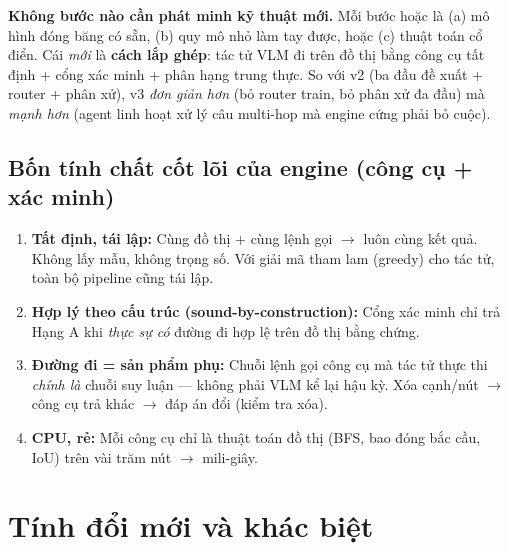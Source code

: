 \documentclass[11pt,a4paper]{article}
\begin{document}
\begin{keyinsight}
\textbf{Không bước nào cần phát minh kỹ thuật mới.} Mỗi bước hoặc là (a) mô hình đóng băng có sẵn, (b) quy mô nhỏ làm tay được, hoặc (c) thuật toán cổ điển. Cái \emph{mới} là \textbf{cách lắp ghép}: tác tử VLM đi trên đồ thị bằng công cụ tất định + cổng xác minh + phân hạng trung thực. So với v2 (ba đầu đề xuất + router + phân xử), v3 \emph{đơn giản hơn} (bỏ router train, bỏ phân xử đa đầu) mà \emph{mạnh hơn} (agent linh hoạt xử lý câu multi-hop mà engine cứng phải bỏ cuộc).
\end{keyinsight}


\subsection{Bốn tính chất cốt lõi của engine (công cụ + xác minh)}

\begin{enumerate}[leftmargin=1.5em]
  \item \textbf{Tất định, tái lập:} Cùng đồ thị + cùng lệnh gọi $\to$ luôn cùng kết quả. Không lấy mẫu, không trọng số. Với giải mã tham lam (greedy) cho tác tử, toàn bộ pipeline cũng tái lập.
  \item \textbf{Hợp lý theo cấu trúc (sound-by-construction):} Cổng xác minh chỉ trả Hạng A khi \emph{thực sự có} đường đi hợp lệ trên đồ thị bằng chứng.
  \item \textbf{Đường đi = sản phẩm phụ:} Chuỗi lệnh gọi công cụ mà tác tử thực thi \emph{chính là} chuỗi suy luận --- không phải VLM kể lại hậu kỳ. Xóa cạnh/nút $\to$ công cụ trả khác $\to$ đáp án đổi (kiểm tra xóa).
  \item \textbf{CPU, rẻ:} Mỗi công cụ chỉ là thuật toán đồ thị (BFS, bao đóng bắc cầu, IoU) trên vài trăm nút $\to$ mili-giây.
\end{enumerate}


\section{Tính đổi mới và khác biệt}
\end{document}
